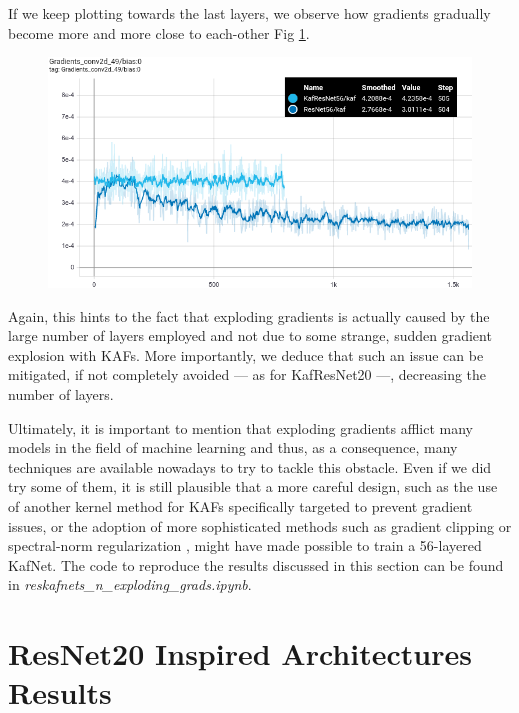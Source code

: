 \documentclass[LaM,binding=0.6cm]{./packages/sapthesis/sapthesis}
\begin{document}
        If we keep plotting towards the last layers, we observe how gradients gradually become more and more close to each-other Fig \ref{fig:gradconv49}.
        \begin{figure}[h!]
            \centering
            \includegraphics[scale=0.38]{gradconv45.png}
            \caption{}
            \label{fig:gradconv49}
        \end{figure}
        Again, this hints to the fact that exploding gradients is actually caused by the large number of layers employed and not due to some strange, sudden gradient explosion with KAFs.
        More importantly, we deduce that such an issue can be mitigated, if not completely avoided — as for KafResNet20 —, decreasing the number of layers.
        
        Ultimately, it is important to mention that exploding gradients afflict many models in the field of machine learning \cite{gradientproblems_rnn} and thus, as a consequence, many techniques are available nowadays to try to tackle this obstacle. 
        Even if we did try some of them, it is still plausible that a more careful design, such as the use of another kernel method for KAFs specifically targeted to prevent gradient issues, or the adoption of more 
        sophisticated methods such as gradient clipping or spectral-norm regularization \cite{spectralnorm_reg}, might have made possible to train a 56-layered KafNet.  
        The code to reproduce the results discussed in this section can be found in \textit{reskafnets\_n\_exploding\_grads.ipynb}.
    \section{ResNet20 Inspired Architectures Results}
\end{document}
